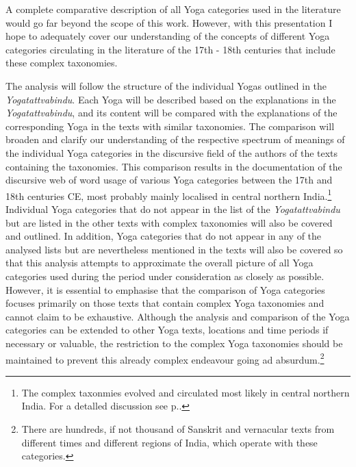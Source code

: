 A complete comparative description of all Yoga categories used in the literature would go far beyond the scope of this work. However, with this presentation I hope to adequately cover our understanding of the concepts of different Yoga categories circulating in the literature of the 17th - 18th centuries that include these complex taxonomies.

The analysis will follow the structure of the individual Yogas outlined in the \textit{Yogatattvabindu}. Each Yoga will be described based on the explanations in the \textit{Yogatattvabindu}, and its content will be compared with the explanations of the corresponding Yoga in the texts with similar taxonomies. The comparison will broaden and clarify our understanding of the respective spectrum of meanings of the individual Yoga categories in the discursive field of the authors of the texts containing the taxonomies. This comparison results in the documentation of the discursive web of word usage of various Yoga categories between the 17th and 18th centuries CE, most probably mainly localised in central northern India.\footnote{The complex taxonmies evolved and circulated most likely in central northern India. For a detalled discussion see p.\pageref{location}.} Individual Yoga categories that do not appear in the list of the \textit{Yogatattvabindu} but are listed in the other texts with complex taxonomies will also be covered and outlined. In addition, Yoga categories that do not appear in any of the analysed lists but are nevertheless mentioned in the texts will also be covered so that this analysis attempts to approximate the overall picture of all Yoga categories used during the period under consideration as closely as possible. However, it is essential to emphasise that the comparison of Yoga categories focuses primarily on those texts that contain complex Yoga taxonomies and cannot claim to be exhaustive. Although the analysis and comparison of the Yoga categories can be extended to other Yoga texts, locations and time periods if necessary or valuable, the restriction to the complex Yoga taxonomies should be maintained to prevent this already complex endeavour going ad absurdum.\footnote{There are hundreds, if not thousand of Sanskrit and vernacular texts from different times and different regions of India, which operate with these categories.}      

